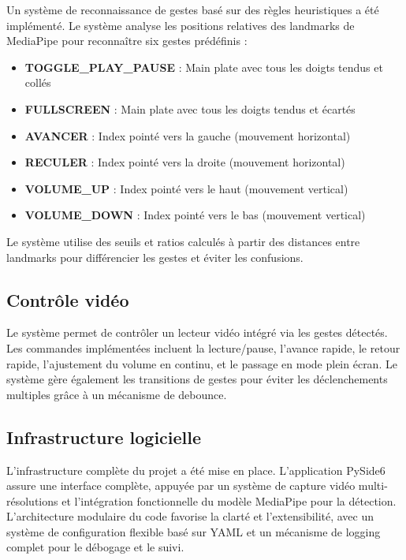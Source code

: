 \documentclass[12pt,a4paper]{article}
\begin{document}
Un système de reconnaissance de gestes basé sur des règles heuristiques a été implémenté. Le système analyse les positions relatives des landmarks de MediaPipe pour reconnaître six gestes prédéfinis :

\begin{itemize}
    \item \textbf{TOGGLE\_PLAY\_PAUSE} : Main plate avec tous les doigts tendus et collés
    \item \textbf{FULLSCREEN} : Main plate avec tous les doigts tendus et écartés
    \item \textbf{AVANCER} : Index pointé vers la gauche (mouvement horizontal)
    \item \textbf{RECULER} : Index pointé vers la droite (mouvement horizontal)
    \item \textbf{VOLUME\_UP} : Index pointé vers le haut (mouvement vertical)
    \item \textbf{VOLUME\_DOWN} : Index pointé vers le bas (mouvement vertical)
\end{itemize}

Le système utilise des seuils et ratios calculés à partir des distances entre landmarks pour différencier les gestes et éviter les confusions.

\subsection{Contrôle vidéo}

Le système permet de contrôler un lecteur vidéo intégré via les gestes détectés. Les commandes implémentées incluent la lecture/pause, l'avance rapide, le retour rapide, l'ajustement du volume en continu, et le passage en mode plein écran. Le système gère également les transitions de gestes pour éviter les déclenchements multiples grâce à un mécanisme de debounce.

\subsection{Infrastructure logicielle}

L'infrastructure complète du projet a été mise en place. L'application PySide6 assure une interface complète, appuyée par un système de capture vidéo multi-résolutions et l'intégration fonctionnelle du modèle MediaPipe pour la détection. L'architecture modulaire du code favorise la clarté et l'extensibilité, avec un système de configuration flexible basé sur YAML et un mécanisme de logging complet pour le débogage et le suivi.
\end{document}
